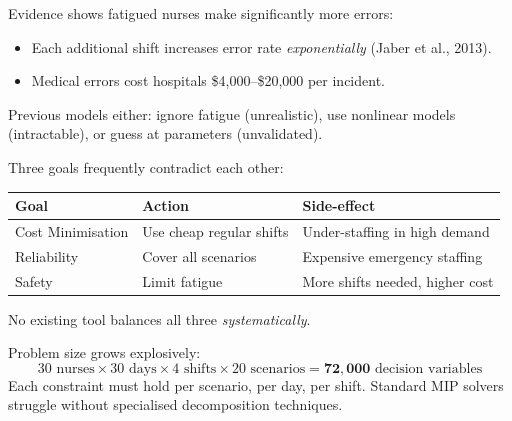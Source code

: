 \documentclass[12pt,a4paper]{article}
\begin{document}
\vspace{6pt}
\begin{problembox}
Evidence shows fatigued nurses make significantly more errors:
\begin{itemize}[itemsep=2pt]
  \item Each additional shift increases error rate \emph{exponentially} (Jaber et al., 2013).
  \item Medical errors cost hospitals \$4,000–\$20,000 per incident.
\end{itemize}
Previous models either: ignore fatigue (unrealistic), use nonlinear models (intractable), or guess at parameters (unvalidated).
\end{problembox}

\vspace{6pt}
\begin{problembox}
Three goals frequently contradict each other:
\begin{center}
\begin{tabular}{@{}lll@{}}
  \toprule
  \textbf{Goal} & \textbf{Action} & \textbf{Side-effect}\\
  \midrule
  Cost Minimisation & Use cheap regular shifts & Under-staffing in high demand\\
  Reliability & Cover all scenarios & Expensive emergency staffing\\
  Safety & Limit fatigue & More shifts needed, higher cost\\
  \bottomrule
\end{tabular}
\end{center}
No existing tool balances all three \emph{systematically}.
\end{problembox}

\vspace{6pt}
\begin{problembox}
Problem size grows explosively:
\[
  30\text{ nurses} \times 30\text{ days} \times 4\text{ shifts} \times 20\text{ scenarios}
  = \mathbf{72{,}000}\text{ decision variables}
\]
Each constraint must hold per scenario, per day, per shift. Standard MIP solvers struggle without specialised decomposition techniques.
\end{problembox}

\newpage
\end{document}
